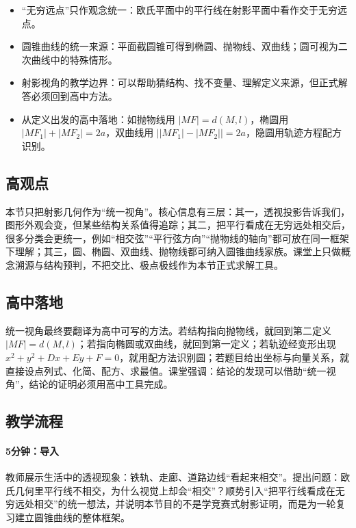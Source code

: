 \documentclass[UTF8,a4paper,11pt]{ctexart}
\begin{document}
\begin{itemize}

\item “无穷远点”只作观念统一：欧氏平面中的平行线在射影平面中看作交于无穷远点。

\item 圆锥曲线的统一来源：平面截圆锥可得到椭圆、抛物线、双曲线；圆可视为二次曲线中的特殊情形。

\item 射影视角的教学边界：可以帮助猜结构、找不变量、理解定义来源，但正式解答必须回到高中方法。

\item 从定义出发的高中落地：如抛物线用 $|MF|=d(M,l)$，椭圆用 $|MF_1|+|MF_2|=2a$，双曲线用 $\bigl||MF_1|-|MF_2|\bigr|=2a$，隐圆用轨迹方程配方识别。

\end{itemize}

\subsection*{高观点}

本节只把射影几何作为“统一视角”。核心信息有三层：其一，透视投影告诉我们，图形外观会变，但某些结构关系值得追踪；其二，把平行看成在无穷远处相交后，很多分类会更统一，例如“相交弦”“平行弦方向”“抛物线的轴向”都可放在同一框架下理解；其三，圆、椭圆、双曲线、抛物线都可纳入圆锥曲线家族。课堂上只做概念溯源与结构预判，不把交比、极点极线作为本节正式求解工具。

\subsection*{高中落地}

统一视角最终要翻译为高中可写的方法。若结构指向抛物线，就回到第二定义 $|MF|=d(M,l)$；若指向椭圆或双曲线，就回到第一定义；若轨迹经变形出现 $x^2+y^2+Dx+Ey+F=0$，就用配方法识别圆；若题目给出坐标与向量关系，就直接设点列式、化简、配方、求最值。课堂强调：结论的发现可以借助“统一视角”，结论的证明必须用高中工具完成。

\subsection*{教学流程}

\paragraph{5分钟：导入}

教师展示生活中的透视现象：铁轨、走廊、道路边线“看起来相交”。提出问题：欧氏几何里平行线不相交，为什么视觉上却会“相交”？顺势引入“把平行线看成在无穷远处相交”的统一想法，并说明本节目的不是学竞赛式射影证明，而是为一轮复习建立圆锥曲线的整体框架。
\end{document}
